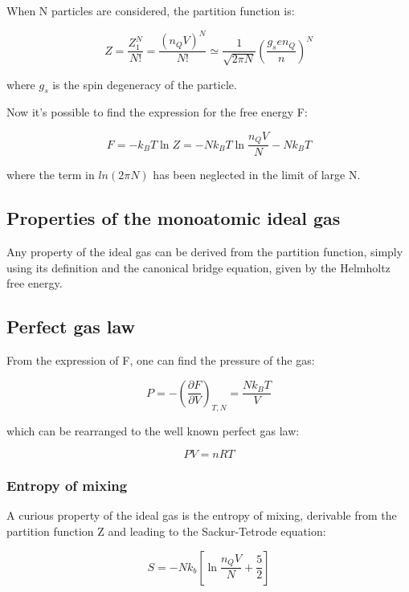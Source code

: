 \documentclass{article}
\begin{document}
When N particles are considered, the partition function is:

\begin{equation}
    Z=\frac{Z_1^N}{N!}=\frac{(n_QV)^N}{N!}\simeq \frac{1}{\sqrt{2\pi N}}\left(\frac{g_sen_Q}{n}\right)^N
\end{equation}

where $g_s$ is the spin degeneracy of the particle.

Now it's possible to find the expression for the free energy F:

\begin{equation}
    F=-k_BT\ln{Z}=-Nk_BT\ln{\frac{n_QV}{N}}-Nk_BT
\end{equation}

where the term in $ln(2\pi N)$ has been neglected in the limit of large N.


\subsection{Properties of the monoatomic ideal gas}

Any property of the ideal gas can be derived from the partition function,
simply using its definition and the canonical bridge equation, given by the Helmholtz free energy.

\subsection{Perfect gas law}

From the expression of F, one can find the pressure of the gas:

\begin{equation}
    P=-\left(\frac{\partial F}{\partial V}\right)_{T,N}=\frac{Nk_BT}{V}
\end{equation}

which can be rearranged to the well known perfect gas law:

\begin{equation}
    PV=nRT
\end{equation}


\subsubsection{Entropy of mixing}

A curious property of the ideal gas is the entropy of mixing, derivable from the partition function Z and
leading to the Sackur-Tetrode equation:

\begin{equation}
    S=-Nk_b\left[\ln{\frac{n_QV}{N}}+\frac{5}{2}\right]
\end{equation}
\end{document}
